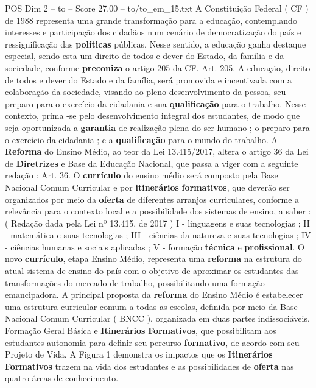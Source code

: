 \begin{textsample}{POS Dim 2 – to – Score 27.00 – to/to\_em\_15.txt}  \label{ex:f2_pos_132}
A Constituição Federal ( CF ) de 1988 representa uma grande transformação para a educação, contemplando interesses e participação dos cidadãos num cenário de democratização do país e ressignificação das \textbf{políticas} públicas.
Nesse sentido, a educação ganha destaque especial, sendo esta um direito de todos e dever do Estado, da família e da sociedade, conforme \textbf{preconiza} o artigo 205 da CF.
Art. 205.
A educação, direito de todos e dever do Estado e da família, será promovida e incentivada com a colaboração da sociedade, visando ao pleno desenvolvimento da pessoa, seu preparo para o exercício da cidadania e sua \textbf{qualificação} para o trabalho.
Nesse contexto, prima -se pelo desenvolvimento integral dos estudantes, de modo que seja oportunizada a \textbf{garantia} de realização plena do ser humano ; o preparo para o exercício da cidadania ; e a \textbf{qualificação} para o mundo do trabalho.
A \textbf{Reforma} do Ensino Médio, ao teor da Lei 13.415/2017, altera o artigo 36 da Lei de \textbf{Diretrizes} e Base da Educação Nacional, que passa a viger com a seguinte redação : Art. 36.
O \textbf{currículo} do ensino médio será composto pela Base Nacional Comum Curricular e por \textbf{itinerários} \textbf{formativos}, que deverão ser organizados por meio da \textbf{oferta} de diferentes arranjos curriculares, conforme a relevância para o contexto local e a possibilidade dos sistemas de ensino, a saber : ( Redação dada pela Lei nº 13.415, de 2017 ) I - linguagens e suas tecnologias ; II - matemática e suas tecnologias ; III - ciências da natureza e suas tecnologias ; IV - ciências humanas e sociais aplicadas ; V - formação \textbf{técnica} e \textbf{profissional}.
O novo \textbf{currículo}, etapa Ensino Médio, representa uma \textbf{reforma} na estrutura do atual sistema de ensino do país com o objetivo de aproximar os estudantes das transformações do mercado de trabalho, possibilitando uma formação emancipadora.
A principal proposta da \textbf{reforma} do Ensino Médio é estabelecer uma estrutura curricular comum a todas as escolas, definida por meio da Base Nacional Comum Curricular ( BNCC ), organizada em duas partes indissociáveis, Formação Geral Básica e \textbf{Itinerários} \textbf{Formativos}, que possibilitam aos estudantes autonomia para definir seu percurso \textbf{formativo}, de acordo com seu Projeto de Vida.
A Figura 1 demonstra os impactos que os \textbf{Itinerários} \textbf{Formativos} trazem na vida dos estudantes e as possibilidades de \textbf{oferta} nas quatro áreas de conhecimento.

\end{textsample}
